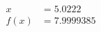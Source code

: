 \documentclass[preview]{standalone}
\begin{document}
\begin{align*}
x &= 5.0222\\f(x) &= 7.9999385
\end{align*}
\end{document}
